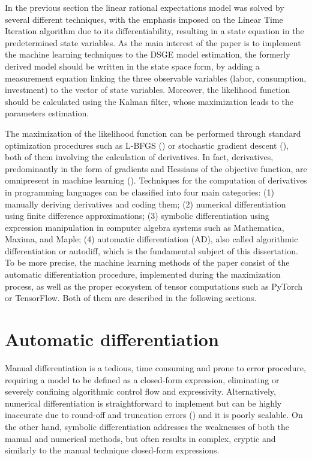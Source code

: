 \documentclass{pracamgr}
\numberwithin{equation}{section}
\begin{document}
In the previous section the linear rational expectations model was solved by several different techniques, with the emphasis imposed on the Linear Time Iteration algorithm due to its differentiability, resulting in a state equation in the predetermined state variables. As the main interest of the paper is to implement the machine learning techniques to the DSGE model estimation, the formerly derived model should be written in the state space form, by adding a measurement equation linking the three observable variables (labor, consumption, investment) to the vector of state variables. Moreover, the likelihood function should be calculated using the Kalman filter, whose maximization leads to the parameters estimation.

The maximization of the likelihood function can be performed through standard optimization procedures such as L-BFGS (\citet{zhu1997algorithm}) or stochastic gradient descent (\citet{bottou2010large}), both of them involving the calculation of derivatives. In fact, derivatives, predominantly in the form of gradients and Hessians of the objective function, are omnipresent in machine learning (\citet{sra2011introduction}). Techniques for the computation of derivatives in programming languages can be classified into four main categories: (1) manually deriving derivatives and coding them; (2) numerical differentiation using finite difference approximations; (3) symbolic differentiation using expression manipulation in computer algebra systems such as Mathematica, Maxima, and Maple; (4) automatic differentiation (AD), also called algorithmic differentiation or autodiff, which is the fundamental subject of this dissertation. To be more precise, the machine learning methods of the paper consist of the automatic differentiation procedure, implemented during the maximization process, as well as the proper ecosystem of tensor computations such as PyTorch or TensorFlow. Both of them are described in the following sections.

\section{Automatic differentiation}

Manual differentiation is a tedious, time consuming and prone to error procedure, requiring a model to be defined as a closed-form expression, eliminating or severely confining algorithmic control flow and expressivity. Alternatively, numerical differentiation is straightforward to implement but can be highly inaccurate due to round-off and truncation errors (\citet{jerrell1997automatic}) and it is poorly scalable. On the other hand, symbolic differentiation addresses the weaknesses of both the manual and numerical methods, but often results in complex, cryptic and similarly to the manual technique closed-form expressions.
\end{document}
